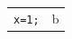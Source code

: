 \documentclass{article}\usepackage{listings}
\begin{document}
\begin{tabular}{p{3cm}l}
\lstinline|x=1;| & b \\
\end{tabular}
\end{document}
